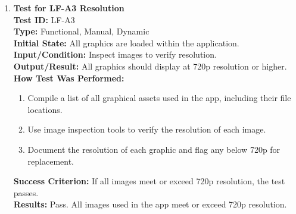 \documentclass[12pt, titlepage]{article}
\begin{document}
\begin{enumerate}
    \item \textbf{Test for LF-A3 Resolution} \\
      \newline
      \textbf{Test ID:} LF-A3 \\
      \textbf{Type:} Functional, Manual, Dynamic \\
      \textbf{Initial State:} All graphics are loaded within the application. \\
      \textbf{Input/Condition:} Inspect images to verify resolution. \\
      \textbf{Output/Result:} All graphics should display at 720p resolution or higher. \\
      \textbf{How Test Was Performed:}
      \begin{enumerate}
          \item Compile a list of all graphical assets used in the app, including their file locations.
          \item Use image inspection tools to verify the resolution of each image.
          \item Document the resolution of each graphic and flag any below 720p for replacement.
      \end{enumerate}
      \textbf{Success Criterion:} If all images meet or exceed 720p resolution, the test passes.\\
      \textbf{Results:} Pass. All images used in the app meet or exceed 720p resolution.\\


\end{enumerate}
\end{document}
